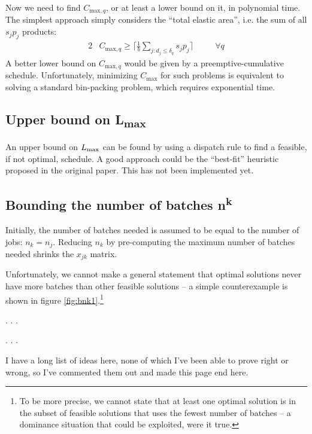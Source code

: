 \documentclass[13pt, letterpaper, twoside]{book}
\begin{document}
Now we need to find $C_{\text{max},q}$, or at least a lower bound on it, in
polynomial time. The simplest approach simply considers the ``total elastic area'',
i.e. the sum of all $s_j p_j$ products:
\begin{alignat}{2}
& C_{\text{max},q} \geq \big\lceil\frac{1}{b} \sum_{j : d_j \leq \delta_q} s_j
p_j\big\rceil \quad
&& \forall q
\end{alignat}
A better lower bound on $C_{\text{max},q}$ would be given by a
preemptive-cumulative schedule. Unfortunately, minimizing $C_{\text{max}}$ for
such problems is equivalent to solving a standard bin-packing problem, which
requires exponential time. 

\subsection{Upper bound on {\sansitalicfont L}\textsubscript{max}}
An upper bound on $L_{\text{max}}$ can be found by using a dispatch rule to find a
feasible, if not optimal, schedule. A good approach could be the ``best-fit''
heuristic proposed in the original paper. {\color{darkred} This has not been
implemented yet.}

\subsection{Bounding the number of batches \sansitalicfont n\textsuperscript{k}}
Initially, the number of batches needed is assumed to be equal to the number of jobs: $n_k = n_j$. Reducing $n_k$ by pre-computing the maximum number of batches needed shrinks the $x_{jk}$ matrix.

Unfortunately, we cannot make a general statement that optimal solutions never have more batches than other feasible solutions -- a simple counterexample is shown in figure \ref{fig:bnk1}.\footnote{To be more precise, we cannot state that at least one optimal solution is in the subset of feasible solutions that uses the fewest number of batches -- a dominance situation that could be exploited, were it true.}

. . .

. . .
\vfil


{\color{darkred} I have a long list of ideas here, none of which I've been able
to prove right or wrong, so I've commented them out and made this page end here.}
\end{document}
